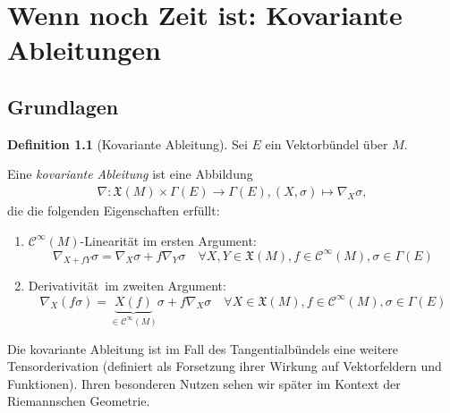 \documentclass[a4paper]{scrbook}
\numberwithin{equation}{chapter}
\newcommand{\sC}{\mathcal{C}^{\infty}}
\newcommand{\vf}{\mathfrak{X}}
\theoremstyle{definition}
\newtheorem{defn}{Definition}[section]
\begin{document}
\chapter{Wenn noch Zeit ist: Kovariante Ableitungen}
	\section{Grundlagen}
		\begin{defn}[Kovariante Ableitung]Sei $E$ ein Vektorbündel über $M$.
		
			Eine \emph{kovariante Ableitung} ist eine Abbildung
			\begin{align*}
				\nabla\colon \vf(M)\times\Gamma(E)\rightarrow\Gamma(E), (X,\sigma)\mapsto \nabla_X \sigma,
			\end{align*}
			die die folgenden Eigenschaften erfüllt:
			\begin{enumerate}[label=(\roman*)]
				\item $\sC(M)$-Linearität im ersten Argument: 
				\begin{equation*}
					\nabla_{X+fY}\sigma=\nabla_X\sigma+f\nabla_Y \sigma\quad\forall X,Y\in\vf(M), f\in\sC(M),\sigma\in\Gamma(E)
				\end{equation*}
				\item \glqq Derivativität\grqq\ im zweiten Argument: 
				\begin{equation*}
					\nabla_X(f\sigma)=\underbrace{X(f)}_{\in\sC(M)} \sigma+f\nabla_X \sigma\quad\forall X\in\vf(M), f\in\sC(M),\sigma\in\Gamma(E)
				\end{equation*}
			\end{enumerate}
		\end{defn}
		Die kovariante Ableitung ist im Fall des Tangentialbündels eine weitere Tensorderivation (definiert als Forsetzung ihrer Wirkung auf Vektorfeldern und Funktionen). Ihren besonderen Nutzen sehen wir später im Kontext der Riemannschen Geometrie.
		
\end{document}
